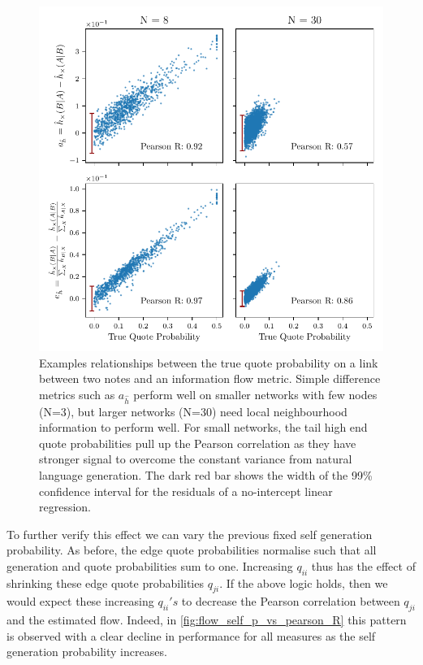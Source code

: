 \begin{figure}[!htbp]
	\centering
	\includegraphics{chapter3/figs/scatterplot_comparison.pdf}
	\caption{Examples relationships between the true quote probability on a link between two notes and an information flow metric. Simple difference metrics such as $a_{\hat{h}}$ perform well on smaller networks with few nodes (N=3), but larger networks (N=30) need local neighbourhood information to perform well. For small networks, the tail high end quote probabilities pull up the Pearson correlation as they have stronger signal to overcome the constant variance from natural language generation. The {\color{red!40!black}dark red} bar shows the width of the 99\% confidence interval for the residuals of a no-intercept linear regression.}
	\label{fig:flow_quote_scatterplot}
\end{figure}

To further verify this effect we can vary the previous fixed self generation probability. As before, the edge quote probabilities normalise such that all generation and quote probabilities sum to one. Increasing $q_{ii}$ thus has the effect of shrinking these edge quote probabilities $q_{ji}$. If the above logic holds, then we would expect these increasing $q_{ii}'s$ to decrease the Pearson correlation between $q_{ji}$ and the estimated flow. Indeed, in \autoref{fig:flow_self_p_vs_pearson_R} this pattern is observed with a clear decline in performance for all measures as the self generation probability increases. 


